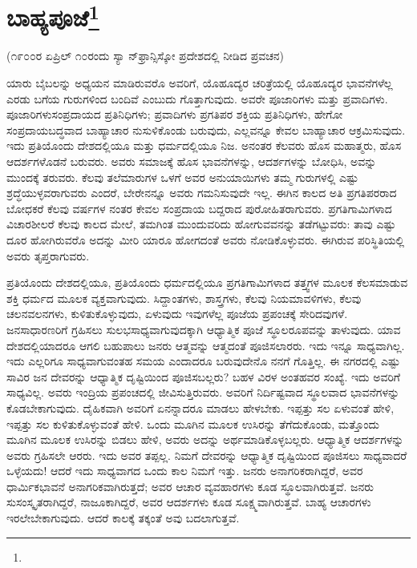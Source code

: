
\chapter[ಬಾಹ್ಯಪೂಜೆ]{ಬಾಹ್ಯಪೂಜೆ\protect\footnote{}}

\begin{center}
(೧೯೦೦ರ ಏಪ್ರಿಲ್ ೧೦ರಂದು ಸ್ಯಾ ನ್‌ಫ್ರಾನ್ಸಿಸ್ಕೋ ಪ್ರದೇಶದಲ್ಲಿ ನೀಡಿದ ಪ್ರವಚನ)
\end{center}

ಯಾರು ಬೈಬಲನ್ನು ಅಧ್ಯಯನ ಮಾಡಿರುವರೊ ಅವರಿಗೆ, ಯೊಹೂದ್ಯರ ಚರಿತ್ರೆಯಲ್ಲಿ ಯೊಹೂದ್ಯರ ಭಾವನೆಗಳೆಲ್ಲ ಎರಡು ಬಗೆಯ ಗುರುಗಳಿಂದ ಬಂದಿವೆ ಎಂಬುದು ಗೊತ್ತಾಗುವುದು. ಅವರೇ ಪೂಜಾರಿಗಳು ಮತ್ತು ಪ್ರವಾದಿಗಳು. ಪೂಜಾರಿಗಳು\break ಸಂಪ್ರದಾಯದ ಪ್ರತಿನಿಧಿಗಳು; ಪ್ರವಾದಿಗಳು ಪ್ರಗತಿಪರ ಶಕ್ತಿಯ ಪ್ರತಿನಿಧಿಗಳು, ಹೇಗೋ ಸಂಪ್ರದಾಯಬದ್ಧವಾದ ಬಾಹ್ಯಾಚಾರ ನುಸುಳಿಕೊಂಡು ಬರುವುದು, ಎಲ್ಲವನ್ನೂ ಕೇವಲ ಬಾಹ್ಯಾಚಾರ ಆಕ್ರಮಿಸುವುದು. ಇದು ಪ್ರತಿಯೊಂದು ದೇಶದಲ್ಲಿಯೂ ಮತ್ತು ಧರ್ಮದಲ್ಲಿಯೂ ನಿಜ. ಅನಂತರ ಕೆಲವರು ಹೊಸ ಮಹಾತ್ಮರು, ಹೊಸ ಆದರ್ಶಗಳೊಡನೆ ಬರುವರು. ಅವರು ಸಮಾಜಕ್ಕೆ ಹೊಸ ಭಾವನೆಗಳನ್ನು, ಆದರ್ಶಗಳನ್ನು ಬೋಧಿಸಿ, ಅವನ್ನು ಮುಂದಕ್ಕೆ ತರುವರು. ಕೆಲವು ತಲೆಮಾರುಗಳ ಒಳಗೆ ಅವರ ಅನುಯಾಯಿಗಳು ತಮ್ಮ ಗುರುಗಳಲ್ಲಿ ಎಷ್ಟು ಶ್ರದ್ಧೆಯುಳ್ಳವರಾಗುವರು ಎಂದರೆ, ಬೇರೇನನ್ನೂ ಅವರು ಗಮನಿಸುವುದೇ ಇಲ್ಲ. ಈಗಿನ ಕಾಲದ ಅತಿ ಪ್ರಗತಿಪರರಾದ ಬೋಧಕರೆ ಕೆಲವು ವರ್ಷಗಳ ನಂತರ ಕೇವಲ ಸಂಪ್ರದಾಯ ಬದ್ದರಾದ ಪುರೋಹಿತರಾಗುವರು. ಪ್ರಗತಿಗಾಮಿಗಳಾದ ವಿಚಾರಶೀಲರೆ ಕೆಲವು ಕಾಲದ ಮೇಲೆ, ತಮಗಿಂತ ಮುಂದುವರಿದು ಹೋಗುವವನನ್ನು ತಡೆಗಟ್ಟುವರು: ತಾವು ಎಷ್ಟು ದೂರ ಹೋಗಿರುವರೊ ಅದನ್ನು ಮೀರಿ ಯಾರೂ ಹೋಗದಂತೆ ಅವರು ನೋಡಿಕೊಳ್ಳುವರು. ಈಗಿರುವ ಪರಿಸ್ಥಿತಿಯಲ್ಲಿ ಅವರು ತೃಪ್ತರಾಗುವರು.

ಪ್ರತಿಯೊಂದು ದೇಶದಲ್ಲಿಯೂ, ಪ್ರತಿಯೊಂದು ಧರ್ಮದಲ್ಲಿಯೂ ಪ್ರಗತಿಗಾಮಿಗಳಾದ ತತ್ತ್ವಗಳ ಮೂಲಕ ಕೆಲಸಮಾಡುವ ಶಕ್ತಿ ಧರ್ಮದ ಮೂಲಕ ವ್ಯಕ್ತವಾಗುವುದು. ಸಿದ್ದಾಂತಗಳು, ಶಾಸ್ತ್ರಗಳು, ಕೆಲವು ನಿಯಮಾವಳಿಗಳು, ಕೆಲವು ಚಲನವಲನಗಳು, ಕುಳಿತುಕೊಳ್ಳುವುದು, ಏಳುವುದು ಇವುಗಳೆಲ್ಲ ಪೂಜೆಯ ಪ್ರಪಂಚಕ್ಕೆ ಸೇರಿದವುಗಳೆ. ಜನಸಾಧಾರಣರಿಗೆ ಗ್ರಹಿಸಲು ಸುಲಭಸಾಧ್ಯವಾಗುವುದಕ್ಕಾಗಿ ಆಧ್ಯಾತ್ಮಿಕ ಪೂಜೆ ಸ್ಥೂಲರೂಪವನ್ನು ತಾಳುವುದು. ಯಾವ ದೇಶದಲ್ಲಿಯಾದರೂ ಆಗಲಿ ಬಹುಪಾಲು ಜನರು ಆತ್ಮವನ್ನು ಆತ್ಮದಂತೆ ಪೂಜಿಸಲಾರರು. ಇದು ಇನ್ನೂ ಸಾಧ್ಯವಾಗಿಲ್ಲ. ಇದು ಎಲ್ಲರಿಗೂ ಸಾಧ್ಯವಾಗುವಂತಹ ಸಮಯ ಎಂದಾದರೂ ಬರುವುದೇನೊ ನನಗೆ ಗೊತ್ತಿಲ್ಲ. ಈ ನಗರದಲ್ಲಿ ಎಷ್ಟು ಸಾವಿರ ಜನ ದೇವರನ್ನು ಆಧ್ಯಾತ್ಮಿಕ ದೃಷ್ಟಿಯಿಂದ ಪೂಜಿಸಬಲ್ಲರು? ಬಹಳ ವಿರಳ ಅಂತಹವರ ಸಂಖ್ಯೆ. ಇದು ಅವರಿಗೆ ಸಾಧ್ಯವಿಲ್ಲ. ಅವರು ಇಂದ್ರಿಯ ಪ್ರಪಂಚದಲ್ಲಿ ಜೀವಿಸುತ್ತಿರುವರು. ಅವರಿಗೆ ನಿರ್ದಿಷ್ಟವಾದ ಸ್ಥೂಲವಾದ ಭಾವನೆಗಳನ್ನು ಕೊಡಬೇಕಾಗುವುದು. ದೈಹಿಕವಾಗಿ ಅವರಿಗೆ ಏನನ್ನಾದರೂ ಮಾಡಲು ಹೇಳಬೇಕು. ಇಪ್ಪತ್ತು ಸಲ ಏಳುವಂತೆ ಹೇಳಿ, ಇಪ್ಪತ್ತು ಸಲ ಕುಳಿತುಕೊಳ್ಳುವಂತೆ ಹೇಳಿ. ಒಂದು ಮೂಗಿನ ಮೂಲಕ ಉಸಿರನ್ನು ತೆಗೆದುಕೊಂಡು, ಮತ್ತೊಂದು ಮೂಗಿನ ಮೂಲಕ ಉಸಿರನ್ನು ಬಿಡಲು ಹೇಳಿ, ಅವರು ಅದನ್ನು ಅರ್ಥಮಾಡಿಕೊಳ್ಳಬಲ್ಲರು. ಆಧ್ಯಾತ್ಮಿಕ ಆದರ್ಶಗಳನ್ನು ಅವರು ಗ್ರಹಿಸಲೇ ಆರರು. ಇದು ಅವರ ತಪ್ಪಲ್ಲ. ನಿಮಗೆ ದೇವರನ್ನು ಆಧ್ಯಾತ್ಮಿಕ ದೃಷ್ಟಿಯಿಂದ ಪೂಜಿಸಲು ಸಾಧ್ಯವಾದರೆ ಒಳ್ಳೆಯದು! ಆದರೆ ಇದು ಸಾಧ್ಯವಾಗದ ಒಂದು ಕಾಲ ನಿಮಗೆ ಇತ್ತು. ಜನರು ಅನಾಗರಿಕರಾಗಿದ್ದರೆ, ಅವರ ಧಾರ್ಮಿಕಭಾವನೆ ಅನಾಗರಿಕವಾಗಿರುತ್ತದೆ; ಅವರ ಆಚಾರ ವ್ಯವಹಾರಗಳು ಕೂಡ ಸ್ಥೂಲವಾಗಿರುತ್ತವೆ. ಜನರು ಸುಸಂಸ್ಕೃತರಾಗಿದ್ದರೆ, ನಾಜೂಕಾಗಿದ್ದರೆ, ಅವರ ಆದರ್ಶಗಳು ಕೂಡ ಸೂಕ್ಷ್ಮವಾಗಿರುತ್ತವೆ. ಬಾಹ್ಯ ಆಚಾರಗಳು ಇರಲೇಬೇಕಾಗುವುದು. ಆದರೆ ಕಾಲಕ್ಕೆ ತಕ್ಕಂತೆ ಅವು ಬದಲಾಗುತ್ತವೆ.

